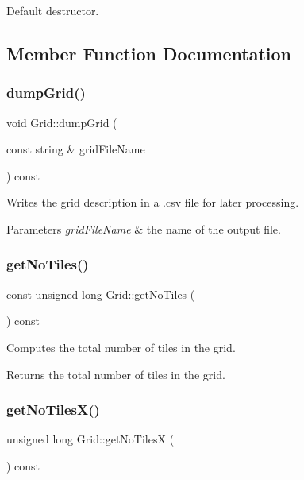 Default destructor. 

\subsection{Member Function Documentation}
\mbox{\label{class_grid_a0024d8d3cdd7b95f9fd61205ce8b9dea}} 
\subsubsection{\texorpdfstring{dump\+Grid()}{dumpGrid()}}
{\footnotesize\ttfamily void Grid\+::dump\+Grid (\begin{DoxyParamCaption}\item[{const string \&}]{grid\+File\+Name }\end{DoxyParamCaption}) const}

Writes the grid description in a .csv file for later processing. 
\begin{DoxyParams}{Parameters}
{\em grid\+File\+Name} & the name of the output file. \\
\hline
\end{DoxyParams}
\mbox{\label{class_grid_ab0a71c762b6c33e6fa2fd49dde38228b}} 
\subsubsection{\texorpdfstring{get\+No\+Tiles()}{getNoTiles()}}
{\footnotesize\ttfamily const unsigned long Grid\+::get\+No\+Tiles (\begin{DoxyParamCaption}{ }\end{DoxyParamCaption}) const}

Computes the total number of tiles in the grid. \begin{DoxyReturn}{Returns}
the total number of tiles in the grid. 
\end{DoxyReturn}
\mbox{\label{class_grid_af29c0c404a908aa46f83afb17d7609a6}} 
\subsubsection{\texorpdfstring{get\+No\+Tiles\+X()}{getNoTilesX()}}
{\footnotesize\ttfamily unsigned long Grid\+::get\+No\+TilesX (\begin{DoxyParamCaption}{ }\end{DoxyParamCaption}) const}

